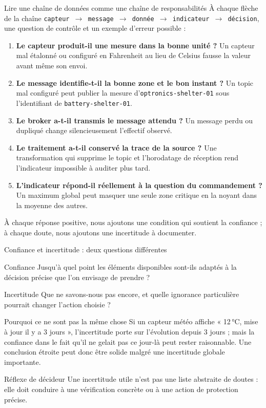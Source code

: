 \documentclass[aspectratio=169]{beamer}
\begin{document}
\begin{frame}{Lire une chaîne de données comme une chaîne de responsabilités}
  \small
  À chaque flèche de la chaîne \texttt{capteur $\to$ message $\to$ donnée $\to$ indicateur $\to$ décision}, une question de contrôle et un exemple d'erreur possible :
  \begin{enumerate}
    \item \textbf{Le capteur produit-il une mesure dans la bonne unité ?} Un capteur mal étalonné ou configuré en Fahrenheit au lieu de Celsius fausse la valeur avant même son envoi.
    \item \textbf{Le message identifie-t-il la bonne zone et le bon instant ?} Un topic mal configuré peut publier la mesure d'\texttt{optronics-shelter-01} sous l'identifiant de \texttt{battery-shelter-01}.
    \item \textbf{Le broker a-t-il transmis le message attendu ?} Un message perdu ou dupliqué change silencieusement l'effectif observé.
    \item \textbf{Le traitement a-t-il conservé la trace de la source ?} Une transformation qui supprime le topic et l'horodatage de réception rend l'indicateur impossible à auditer plus tard.
    \item \textbf{L'indicateur répond-il réellement à la question du commandement ?} Un maximum global peut masquer une seule zone critique en la noyant dans la moyenne des autres.
  \end{enumerate}
  \vfill
  À chaque réponse positive, nous ajoutons une condition qui soutient la confiance ; à chaque doute, nous ajoutons une incertitude à documenter.
\end{frame}

\begin{frame}{Confiance et incertitude : deux questions différentes}
  \begin{block}{Confiance}
    Jusqu'à quel point les éléments disponibles sont-ils adaptés à la décision précise que l'on envisage de prendre ?
  \end{block}
  \begin{block}{Incertitude}
    Que ne savons-nous pas encore, et quelle ignorance particulière pourrait changer l'action choisie ?
  \end{block}
  \begin{exampleblock}{Pourquoi ce ne sont pas la même chose}
    Si un capteur météo affiche « 12\,°C, mise à jour il y a 3 jours », l'incertitude porte sur l'évolution depuis 3 jours ; mais la confiance dans le fait qu'il ne gelait pas ce jour-là peut rester raisonnable. Une conclusion étroite peut donc être solide malgré une incertitude globale importante.
  \end{exampleblock}
  \begin{alertblock}{Réflexe de décideur}
    Une incertitude utile n'est pas une liste abstraite de doutes : elle doit conduire à une vérification concrète ou à une action de protection précise.
  \end{alertblock}
\end{frame}
\end{document}
